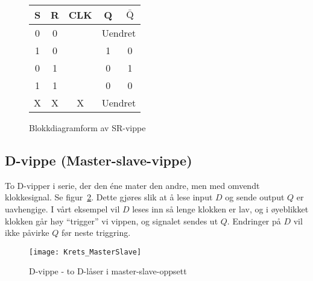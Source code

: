 \documentclass[12pt,a4paper,norsk]{article}
\newcommand{\red}[1]{{\color{Red}#1}}
\newcommand{\rising}{\texttiming{[-,timing/slope=0]LH}}
\begin{document}
\begin{figure}[hbt!]
  \centering
  \begin{minipage}{.45\textwidth}
    \centering
    \caption{Blokkdiagramform av SR-vippe\label{fig:SR-flip-flop-block}}
  \end{minipage}\hfill
  \begin{minipage}{.45\textwidth}
    \centering
    \begin{tabular}{ccc|cc}
      \toprule
      S & R & CLK & Q & $\bar{\text{Q}}$ \\
      \midrule
      0 & 0 & \rising{} & \multicolumn{2}{c}{Uendret} \\
      1 & 0 & \rising{} & 1 & 0 \\
      0 & 1 & \rising{} & 0 & 1 \\
      1 & 1 & \rising{} & \red{0} & \red{0} \\
      X & X & X & \multicolumn{2}{c}{Uendret} \\
      \bottomrule
    \end{tabular}
  \end{minipage}
\end{figure}

\subsection{D-vippe (Master-slave-vippe)}
To D-vipper i serie, der den éne mater den andre, men med omvendt klokkesignal. Se
figur~\ref{fig:master_slave}. Dette gjøres slik at å lese input $D$ og sende
output $Q$ er uavhengige. I vårt eksempel vil $D$ leses inn så lenge
klokken er lav, og i øyeblikket klokken går høy ``trigger'' vi vippen, og
signalet sendes ut $Q$. Endringer på $D$ vil ikke påvirke $Q$ før
neste triggring.

\begin{figure}[hbt!]
  \centering
  \texttt{[image: Krets\_MasterSlave]}
  \caption{D-vippe - to D-låser i master-slave-oppsett\label{fig:master_slave}}
\end{figure}
\end{document}
